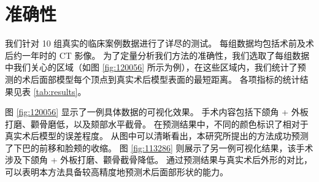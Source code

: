 \section{准确性}
\label{sec:accuracy}

我们针对 10 组真实的临床案例数据进行了详尽的测试。
每组数据均包括术前及术后约一年时的 CT 影像。
为了定量分析我们方法的准确性，我们选取了每组数据中我们关心的区域（如图 \ref{fig:120056} 所示为例），在这些区域内，我们统计了预测的术后面部模型每个顶点到真实术后模型表面的最短距离。
各项指标的统计结果见表 \ref{tab:results}。

图 \ref{fig:120056} 显示了一例具体数据的可视化效果。
手术内容包括下颌角 + 外板打磨、颧骨磨低，以及颏部水平截骨。
在预测结果中，不同的颜色标识了相对于真实术后模型的误差程度。
从图中可以清晰看出，本研究所提出的方法成功预测了下巴的前移和脸颊的收缩。
图 \ref{fig:113286} 则展示了另一例可视化结果，该手术涉及下颌角 + 外板打磨、颧骨截骨降低。
通过预测结果与真实术后外形的对比，可以表明本方法具备较高精度地预测术后面部形状的能力。

